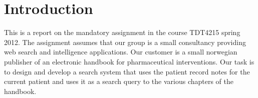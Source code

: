 \chapter{Introduction}
This is a report on the mandatory assignment in the course TDT4215 spring 2012. The assignment assumes that our group is a small consultancy providing web search and intelligence applications. Our customer is a small norwegian publisher of an electronic handbook for pharmaceutical interventions. Our task is to design and develop a search system that uses the patient record notes for the current patient and uses it as a search query to the various chapters of the handbook.